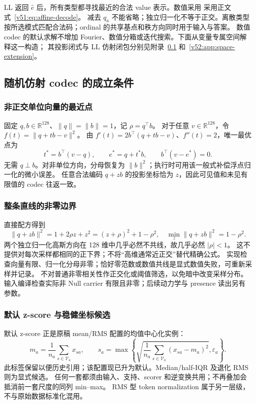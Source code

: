 \documentclass[11pt,UTF8,fontset=fandol]{ctexart}
\numberwithin{equation}{section}
\theoremstyle{definition}
\newcommand{\Vset}{\mathcal V}
\begin{document}
LL 返回 $\widehat e$ 后，所有类型都寻找最近的合法 value 表示。数值采用
采用正文式~\eqref{v51:eq:affine-decode}。
减去 $q_a$ 不能省略；独立归一化不等于正交。离散类型按所选模式匹配合法码；ordinal 的共享基点和秩方向同时用于输入与答案。
数值 codec 的默认求解不增加 Fourier、数值分箱或迭代搜索。下面从变量专属空间解释这一构造；
其投影闭式与 LL 仿射闭包分别见附录~\ref{v51:app:affine} 和~\ref{v52:app:space-extension}。

\subsection{随机仿射 codec 的成立条件}
\label{v51:app:affine}
\subsubsection{非正交单位向量的最近点}
固定 $q,b\in\mathbb R^{128}$、$\|q\|=\|b\|=1$，记 $\rho=q^\top b$。
对于任意 $v\in\mathbb R^{128}$，令 $f(t)=\|q+tb-v\|^2$。
由 $f'(t)=2b^\top(q+tb-v)$、$f''(t)=2$，唯一最优点为
\begin{equation}
 t^*=b^\top(v-q),\qquad e^*=q+t^*b,\qquad b^\top(v-e^*)=0.
 \label{v51:eq:projection-proof}
\end{equation}
无需 $q\perp b$。对非单位方向，分母恢复为 $\|b\|^2$；执行时可用该一般式补偿浮点归一化的微小误差。
任意合法编码 $q+zb$ 的投影坐标恰为 $z$，因此可见值和未见有限值的 codec 往返一致。

\subsubsection{整条直线的非零边界}
直接配方得到
\begin{equation}
 \|q+zb\|^2=1+2\rho z+z^2=(z+\rho)^2+1-\rho^2,
 \quad \min_z\|q+zb\|^2=1-\rho^2.
 \label{v51:eq:line-zero-bound}
\end{equation}
两个独立归一化高斯方向在 128 维中几乎必然不共线，故几乎必然 $|\rho|<1$。
这不提供对每次采样都相同的正下界；不将“高维通常近正交”替代精确公式。
实现检查向量有限、归一化分母非零；恰好零范数或数值共线是显式数值失败，可重新采样并记录。
不对普通非零相关性作正交化或阈值筛选，以免暗中改变采样分布。
输入编译检查实际非 Null carrier 有限且非零；后续动力学与 presence 读出另有参数。


\subsubsection{默认 z-score 与稳健坐标候选}
默认 z-score 正是原稿 mean/RMS 配置的均值中心化实例：
\begin{equation}
 m_a=\frac1{n_a}\sum_{s\in\Vset_a}x_{sa},\qquad
 s_a=\max\!\left\{\sqrt{\frac1{n_a}\sum_{s\in\Vset_a}(x_{sa}-m_a)^2},\varepsilon_a\right\}.
 \label{v51:eq:mean-rms-option}
\end{equation}
此标签保留以便历史引用；该配置现已升为默认。Median/half-IQR 及退化 RMS 则为显式候选。
任何一套都须由输入、支持、scorer 和逆变换共用；不再叠加会抵消前一套尺度的同列 min--max。
RMS 型 token normalization 属于另一层级，不与原始数据标准化混用。
\end{document}
